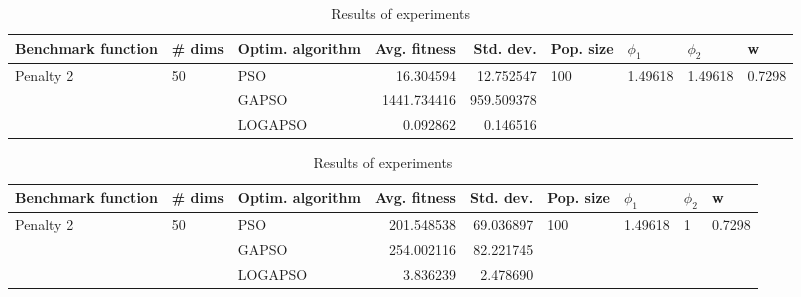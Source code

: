 \documentclass{article}
\begin{document}
\begin{table}
\centering
\caption{Results of experiments}
\begin{tabular}{lllrrllll}
\toprule
        Benchmark function &             \# dims & Optim. algorithm &  Avg. fitness &  Std. dev. &            Pop. size &               $\phi_{1}$ &               $\phi_{2}$ &                       w \\
\midrule
\multirow{3}{*}{Penalty 2} & \multirow{3}{*}{50} &              PSO &     16.304594 &  12.752547 & \multirow{3}{*}{100} & \multirow{3}{*}{1.49618} & \multirow{3}{*}{1.49618} & \multirow{3}{*}{0.7298} \\
                           &                     &            GAPSO &   1441.734416 & 959.509378 &                      &                          &                          &                         \\
                           &                     &          LOGAPSO &      0.092862 &   0.146516 &                      &                          &                          &                         \\
\bottomrule
\end{tabular}
\end{table}
\begin{table}
\centering
\caption{Results of experiments}
\begin{tabular}{lllrrllll}
\toprule
        Benchmark function &             \# dims & Optim. algorithm &  Avg. fitness &  Std. dev. &            Pop. size &               $\phi_{1}$ &         $\phi_{2}$ &                       w \\
\midrule
\multirow{3}{*}{Penalty 2} & \multirow{3}{*}{50} &              PSO &    201.548538 &  69.036897 & \multirow{3}{*}{100} & \multirow{3}{*}{1.49618} & \multirow{3}{*}{1} & \multirow{3}{*}{0.7298} \\
                           &                     &            GAPSO &    254.002116 &  82.221745 &                      &                          &                    &                         \\
                           &                     &          LOGAPSO &      3.836239 &   2.478690 &                      &                          &                    &                         \\
\bottomrule
\end{tabular}
\end{table}
\end{document}

